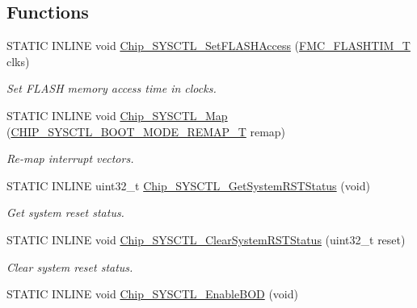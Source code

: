 \subsection*{Functions}
\begin{DoxyCompactItemize}
\item 
S\+T\+A\+T\+I\+C I\+N\+L\+I\+N\+E void \hyperlink{group___s_y_s_c_t_l__17_x_x__40_x_x_gacaea88993f709565eb0166779426b6d8}{Chip\+\_\+\+S\+Y\+S\+C\+T\+L\+\_\+\+Set\+F\+L\+A\+S\+H\+Access} (\hyperlink{group___s_y_s_c_t_l__17_x_x__40_x_x_ga0779e088e3fa7b3a18e66fa0949da8a7}{F\+M\+C\+\_\+\+F\+L\+A\+S\+H\+T\+I\+M\+\_\+\+T} clks)
\begin{DoxyCompactList}\small\item\em Set F\+L\+A\+S\+H memory access time in clocks. \end{DoxyCompactList}\item 
S\+T\+A\+T\+I\+C I\+N\+L\+I\+N\+E void \hyperlink{group___s_y_s_c_t_l__17_x_x__40_x_x_gab44b1cefe990081961a517994babfcbd}{Chip\+\_\+\+S\+Y\+S\+C\+T\+L\+\_\+\+Map} (\hyperlink{group___s_y_s_c_t_l__17_x_x__40_x_x_gaacc03dffa90a522f3fc992e9940d196e}{C\+H\+I\+P\+\_\+\+S\+Y\+S\+C\+T\+L\+\_\+\+B\+O\+O\+T\+\_\+\+M\+O\+D\+E\+\_\+\+R\+E\+M\+A\+P\+\_\+\+T} remap)
\begin{DoxyCompactList}\small\item\em Re-\/map interrupt vectors. \end{DoxyCompactList}\item 
S\+T\+A\+T\+I\+C I\+N\+L\+I\+N\+E uint32\+\_\+t \hyperlink{group___s_y_s_c_t_l__17_x_x__40_x_x_gadd10c121cb32ddc55dd62e13de780c59}{Chip\+\_\+\+S\+Y\+S\+C\+T\+L\+\_\+\+Get\+System\+R\+S\+T\+Status} (void)
\begin{DoxyCompactList}\small\item\em Get system reset status. \end{DoxyCompactList}\item 
S\+T\+A\+T\+I\+C I\+N\+L\+I\+N\+E void \hyperlink{group___s_y_s_c_t_l__17_x_x__40_x_x_ga565050aac84c3cfa86874d42630d7eb8}{Chip\+\_\+\+S\+Y\+S\+C\+T\+L\+\_\+\+Clear\+System\+R\+S\+T\+Status} (uint32\+\_\+t reset)
\begin{DoxyCompactList}\small\item\em Clear system reset status. \end{DoxyCompactList}\item 
S\+T\+A\+T\+I\+C I\+N\+L\+I\+N\+E void \hyperlink{group___s_y_s_c_t_l__17_x_x__40_x_x_ga68a4fd386020cb12d47b03f95903b9f1}{Chip\+\_\+\+S\+Y\+S\+C\+T\+L\+\_\+\+Enable\+B\+O\+D} (void)

\end{DoxyCompactItemize}
